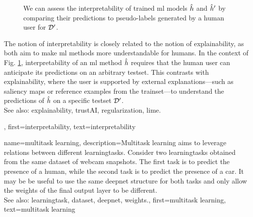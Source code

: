 {{\begin{figure}[H]
\begin{center}
 			\caption{We can assess the interpretability of trained \gls{ml} \glspl{model} 
 			$\hat{h}$ and $\hat{h}'$ by comparing their \glspl{prediction} 
			to pseudo-\glspl{label} generated by a human user for $\mathcal{D}'$. 
			\label{fig_aug_simulatability_dict}}
 			\end{center}
	 	\end{figure} 
 	 	The notion of interpretability is closely related to the notion of \gls{explainability}, 
 	 	as both aim to make \gls{ml} methods more understandable for humans. 
		In the context of Fig. \ref{fig_aug_simulatability_dict}, interpretability of an \gls{ml} 
	 	method $\hat{h}$ requires that the human user can anticipate its \glspl{prediction} 
	 	on an arbitrary \gls{testset}. This contrasts with \gls{explainability}, where the user is supported by 
	 	external \glspl{explanation}—such as saliency \glspl{map} or reference examples from the \gls{trainset}—to 
		understand the \glspl{prediction} of $\hat{h}$ on a specific \gls{testset} $\mathcal{D}'$. 
	 	\\ 
	 	See also: \gls{explainability}, \gls{trustAI}, \gls{regularization}, \gls{lime}. },
	first={interpretability},
 	text={interpretability}
}

{name={multitask learning},
	description={Multitask learning aims to leverage relations between 
	 	different \glspl{learningtask}. Consider two \glspl{learningtask} obtained from the 
	 	same \gls{dataset} of webcam snapshots. The first task is to predict the presence 
	 	of a human, while the second task is to predict the presence of a car. It may be be useful 
	 	to use the same \gls{deepnet} structure for both tasks and only allow the \gls{weights} of 
	 	the final output layer to be different.
	 			\\ 
		See also: \gls{learningtask}, \gls{dataset}, \gls{deepnet}, \gls{weights}.},
	first={multitask learning},
	text={multitask learning}
}

